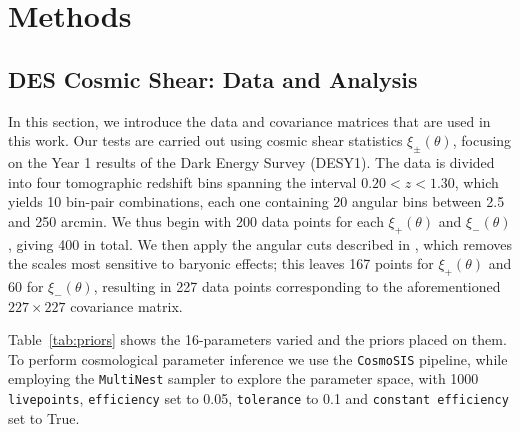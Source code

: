 \documentclass[twocolumn]{\docclass}
\newcommand{\rsec}[1]{\S\ref{sec:#1}}
\begin{document}
	
	\section{Methods}
	\label{sec:methods}
	
	\subsection{DES Cosmic Shear: Data and Analysis}
	\label{subsec:data_and_analysis}
	
	In this section, we introduce the data and covariance matrices that are used in this work. Our tests are carried out using cosmic shear statistics $\xi_\pm(\theta)$, focusing on the Year 1 results of the Dark Energy Survey \citep{Troxel:2017xyo,Abbott:2018cms} (DESY1). The data is divided into four tomographic redshift bins spanning the interval $0.20 < z < 1.30$, which yields 10 bin-pair combinations, each one containing 20 angular bins between 2.5 and 250 arcmin. We thus begin with 200 data points for each $\xi_+(\theta)$ and $\xi_-(\theta)$, giving 400 in total. We then apply the angular cuts described in \citep{Abbott:2018cms}, which removes the scales most sensitive to baryonic effects; this leaves 167 points for $\xi_+(\theta)$ and 60 for $\xi_-(\theta)$, resulting in 227 data points corresponding to the aforementioned $227 \times 227$ covariance matrix. 
	
	Table~\ref{tab:priors} shows the 16-parameters varied and the priors placed on them. To perform cosmological parameter inference we use the {\tt CosmoSIS} \citep{Zuntz:2015med, Lewis2000taj, Kirk2012mnras, Kilbinger2009aa, Howlett2012jcap, Bridle2007njp, Takahashi2012taj, Smith2003mnras} pipeline, while employing the {\tt MultiNest} \citep{Feroz:2009fhb} sampler to explore the parameter space, with 1000 {\tt livepoints}, {\tt efficiency} set to 0.05, {\tt tolerance} to 0.1 and {\tt constant efficiency} set to True.
	
\end{document}
